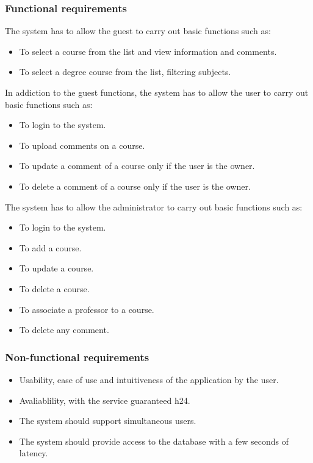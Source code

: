 \documentclass[a4paper]{article}
\begin{document}
\subsubsection{Functional requirements}
The system has to allow the guest to carry out basic functions such as:
\begin{itemize}
\item To select a course from the list and view information and comments.
\item To select a degree course from the list, filtering subjects.
\end{itemize}
In addiction to the guest functions, the system has to allow the user to carry out basic functions such as:
\begin{itemize}
\item To login to the system.
\item To upload comments on a course.
\item To update a comment of a course only if the user is the owner.
\item To delete a comment of a course only if the user is the owner.
\end{itemize}
\vspace{2mm}
The system has to allow the administrator to carry out basic functions such as:
\begin{itemize}
\item To login to the system.
\item To add a course.
\item To update a course.
\item To delete a course.
\item To associate a professor to a course.
\item To delete any comment.
\end{itemize}
\vspace{2mm}

\subsubsection{Non-functional requirements}
\begin{itemize}
\item Usability, ease of use and intuitiveness of the application by the user.
\item Avaliablility, with the service guaranteed h24.
\item The system should support simultaneous users.
\item The system should provide access to the database with a few seconds of latency.
\end{itemize}
\end{document}
